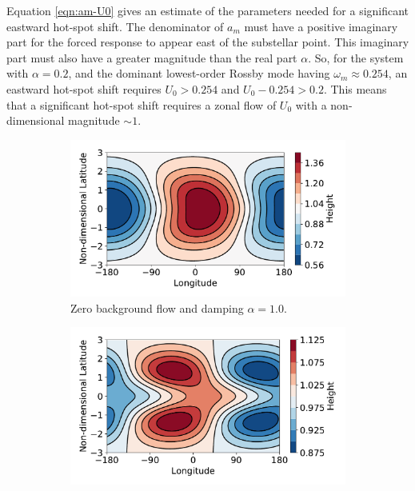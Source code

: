 Equation \ref{eqn:am-U0} gives an estimate of the parameters needed for a significant eastward hot-spot shift. The denominator of $a_{m}$ must have a positive imaginary part for the forced response to appear east of the substellar point. This imaginary part must also have a greater magnitude than the real part $\alpha$. So, for the system with $\alpha = 0.2$, and the dominant lowest-order Rossby mode having $\omega_{m} \approx 0.254$, an eastward hot-spot shift requires $U_{0} > 0.254$ and $U_{0}-0.254 > 0.2$. This means that a significant hot-spot shift requires a zonal flow of $U_{0}$ with a non-dimensional magnitude $\sim 1$.


\begin{figure}
  \centering
  \begin{subfigure}[t]{0.30\textwidth}
    \includegraphics[width=1.0\textwidth]{figures/wave-mean-flow/beta-damping.pdf}
    \caption{Zero background flow and damping $\alpha = 1.0$.}
    \label{fig:alpha-dominates-shift}
  \end{subfigure}
  \quad
  \begin{subfigure}[t]{0.30\textwidth}
    \includegraphics[width=1.0\textwidth]{figures/wave-mean-flow/beta-eigenvalue.pdf}

\end{subfigure}
\end{figure}
